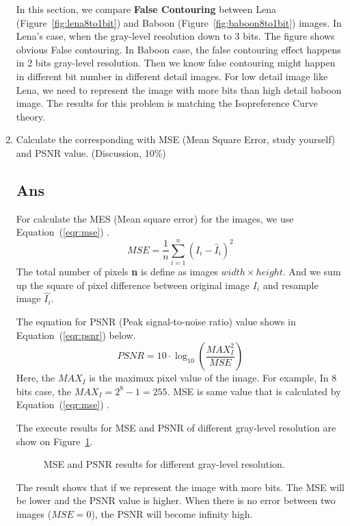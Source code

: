 \documentclass[a4paper, 11pt]{article}
\begin{document}
\begin{enumerate}[label=\alph*.]
\begin{figure}[h]
  \end{figure}
  \newpage
  In this section, we compare \textbf{False Contouring} between Lena 
  (Figure~\ref{fig:lena8to1bit}) and Baboon (Figure~\ref{fig:baboon8to1bit}) images. 
  In Lena's case, when the gray-level resolution down to 3 bits. The figure shows obvious 
  False contouring. In Baboon case, the false contouring effect happens in 2 bits gray-level 
  resolution. Then we know false contouring might happen in different bit number in different
  detail images. For low detail image like Lena, we need to represent the image with more 
  bits than high detail baboon image. The results for this problem is matching the 
  Isopreference Curve theory.
  \item Calculate the corresponding with MSE (Mean Square Error, study yourself) and PSNR value.
  (Discussion, 10\%)
  \subsection*{Ans}
  For calculate the MES (Mean square error) for the images, we use Equation~(\ref{eqr:mse}) 
  \cite{MSE-wiki}.
  \begin{equation}
    MSE=\frac{1}{n}\sum_{i=1}^{n}(I_{i}-\hat{I}_{i})^2
    \label{eqr:mse}
  \end{equation}
  The total number of pixels \textbf{n} is define as images $width \times height$. And 
  we sum up the square of pixel difference between original image \textbf{$I_{i}$} and resample
  image \textbf{$\hat{I_{i}}$}.

  \vspace{1em}
  The equation for PSNR (Peak signal-to-noise ratio) value shows in Equation~(\ref{eqr:psnr}) below.
  \begin{equation}
    PSNR=10\cdot \log_{10}(\frac{MAX_I^2}{MSE})
    \label{eqr:psnr}
  \end{equation}
  Here, the $MAX_I$ is the maximux pixel value of the image. For example, In 8 bits case, the 
  $MAX_I=2^8-1=255$. MSE is same value that is calculated by Equation~(\ref{eqr:mse}) \cite{PSNR-wiki}.

  \vspace{1em}
  The execute results for MSE and PSNR of different gray-level resolution are show on 
  Figure~\ref{fig:hw2_1b}.
  \begin{figure}[h]
    \centering
  \end{figure}
  \begin{figure}[h]
    \centering
    \caption{MSE and PSNR results for different gray-level resolution.}
    \label{fig:hw2_1b}
  \end{figure}

  The result shows that if we represent the image with more bits. The MSE will be lower and 
  the PSNR value is higher. When there is no error between two images ($MSE=0$), the PSNR will 
  become infinity high.
\end{enumerate}
\end{document}
